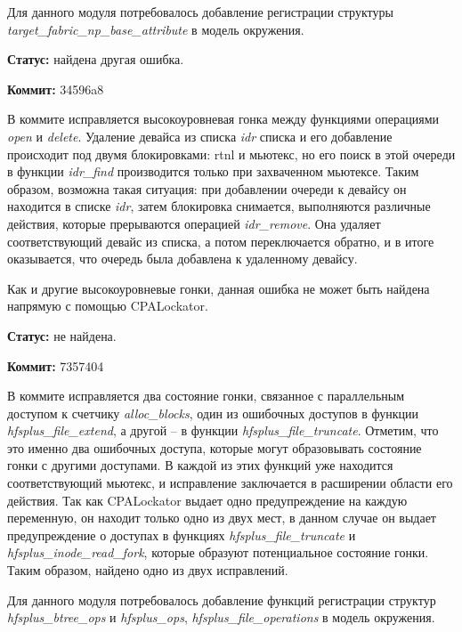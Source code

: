 Для данного модуля потребовалось добавление регистрации структуры \textit{target\_fabric\_np\_base\_attribute} в модель окружения.

\textbf{Статус:} найдена другая ошибка.

\vspace{1cm}

\textbf{Коммит:} 34596a8

В коммите исправляется высокоуровневая гонка между функциями операциями \textit{open} и \textit{delete}.
Удаление девайса из списка \textit{idr} списка и его добавление происходит под двумя блокировками: rtnl и мьютекс, но его поиск  в этой очереди в функции \textit{idr\_find} производится только при захваченном мьютексе.
Таким образом, возможна такая ситуация: при добавлении очереди к девайсу он находится в списке \textit{idr}, затем блокировка снимается, выполняются различные действия, которые прерываются операцией \textit{idr\_remove}. 
Она удаляет соответствующий девайс из списка, а потом переключается обратно, и в итоге оказывается, что очередь была добавлена к удаленному девайсу.

Как и другие высокоуровневые гонки, данная ошибка не может быть найдена напрямую с помощью CPALockator.

\textbf{Статус:} не найдена.

\vspace{1cm}

\textbf{Коммит:} 7357404

В коммите исправляется два состояние гонки, связанное с параллельным доступом к счетчику \textit{alloc\_blocks}, один из ошибочных доступов в функции \textit{hfsplus\_file\_extend}, а другой -- в функции \textit{hfsplus\_file\_truncate}.
Отметим, что это именно два ошибочных доступа, которые могут образовывать состояние гонки с другими доступами.
В каждой из этих функций уже находится соответствующий мьютекс, и исправление заключается в расширении области его действия.
Так как CPALockator выдает одно предупреждение на каждую переменную, он находит только одно из двух мест, в данном случае он выдает предупреждение о доступах в функциях \textit{hfsplus\_file\_truncate} и \textit{hfsplus\_inode\_read\_fork}, которые образуют потенциальное состояние гонки.
Таким образом, найдено одно из двух исправлений.

Для данного модуля потребовалось добавление функций регистрации структур \textit{hfsplus\_btree\_ops} и \textit{hfsplus\_ops}, \textit{hfsplus\_file\_operations} в модель окружения.

